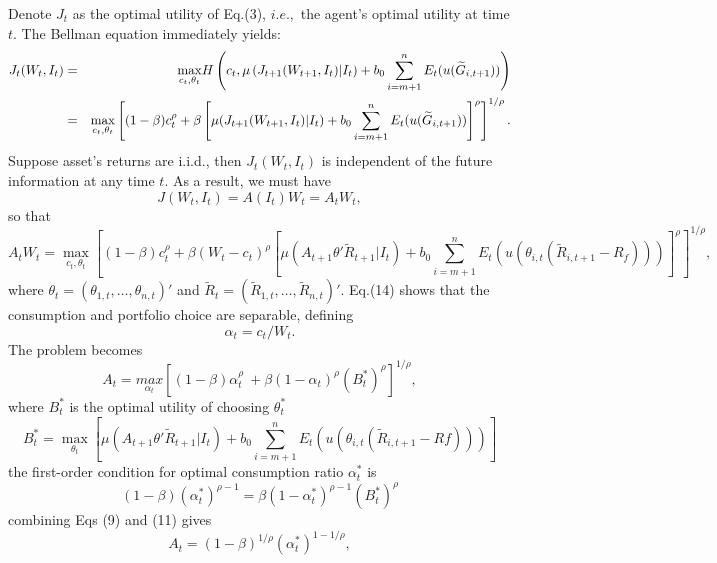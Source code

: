 \documentclass[ukenglish,nottitlepage,thmsb,11pt,letterpaper]{article}
\begin{document}
Denote $J_t$ as the optimal utility of Eq.(3), $i.e.,$ the agent's optimal utility at time $t$. The Bellman equation immediately yields:
\begin{eqnarray*}
J_t (W_t, I_t) &=& \underset{c_t, \theta_t}{\max} H\left( c_t, \mu \left(J_{t+1} (W_{t+1}, I_t) \vert I_t \right) +  b_0 \sum_{i = m+1}^{n}E_t ( u(\widetilde{G}_{i,t+1}) ) \right)
\cr
&=& \underset{c_t, \theta_t}{\max} \left[ (1-\beta) c_t^ \rho + \beta \left[ \mu  (J_{t+1} (W_{t+1}, I_t) \vert I_t ) +  b_0 \sum_{i = m+1}^{n}E_t ( u(\widetilde{G}_{i,t+1}) ) \right]^ \rho\right]^{1/\rho}.
\end{eqnarray*}
Suppose asset's returns are i.i.d., then $J_t (W_t, I_t)$ is independent of the future information at any time $t$. As a result, we must have
\begin{equation}
J(W_t,I_t) = A(I_t)W_t = A_t W_t,
\end{equation}
so that
\begin{equation}
A_t W_t =  \underset{c_t, \theta_t}{\max} \left[ (1-\beta) c_t^ \rho + \beta (W_t-c_t)^{\rho} \left[ \mu (A_{t+1} \theta' \widetilde{R}_{t+1} \vert I_t ) +  b_0 \sum_{i = m+1}^{n}E_t ( u(\theta_{i,t} (\widetilde{R}_{i,t+1} - R_f)) ) \right]^ \rho\right]^{1/\rho},
\end{equation}
where $\theta_t = (\theta_{1,t}, \dots, \theta_{n,t})'$ and $\widetilde{R}_t = (\widetilde{R}_{1,t}, \dots, \widetilde{R}_{n,t})'$.
Eq.(14) shows that the consumption and portfolio choice are separable, defining
\begin{equation*}
\alpha_t = c_t / W_t.
\end{equation*}
The problem becomes
\begin{equation}
A_t = \underset{\alpha_t}{max} \left[ (1-\beta) \alpha_t ^{\rho}\ + \beta (1-\alpha_t)^\rho (B^*_{t})^\rho \right]^{1/\rho},
\end{equation}
where $B^*_{t}$ is the optimal utility of choosing $\theta_t ^*$
\begin{equation}
B^*_{t} = \underset {\theta_t}{\max} \left[ \mu (A_{t+1} \theta' \widetilde{R}_{t+1} \vert I_t ) +  b_0 \sum_{i = m+1}^{n}E_t ( u(\theta_{i,t} (\widetilde{R}_{i,t+1} - Rf) )) \right]
\end{equation}
the first-order condition for optimal consumption ratio $\alpha_t^*$ is
\begin{equation}
(1-\beta)(\alpha_{t} ^ {*})^{\rho-1} = \beta(1-\alpha_{t} ^ {*})^{\rho-1}(B^*_{t})^\rho
\end{equation}
combining Eqs (9) and (11) gives
\begin{equation}
A_t = (1-\beta)^{1/\rho}(\alpha_t^*)^{1-1/ \rho},
\end{equation}
\end{document}
